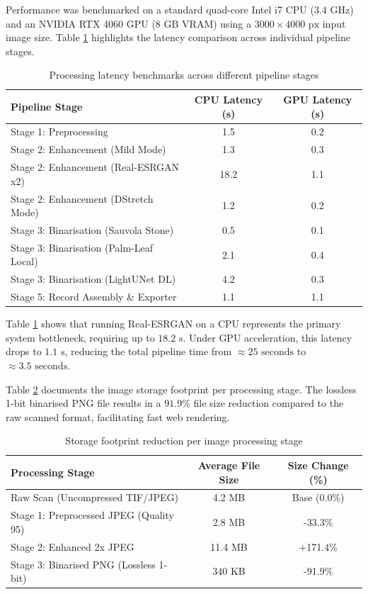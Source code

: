 Performance was benchmarked on a standard quad-core Intel i7 CPU ($3.4\text{ GHz}$) and an NVIDIA RTX 4060 GPU ($8\text{ GB}$ VRAM) using a $3000 \times 4000\text{ px}$ input image size. Table \ref{tab:processing_latency} highlights the latency comparison across individual pipeline stages.

\begin{table}[htbp]
\centering
\fontsize{10}{12}\selectfont
\caption{Processing latency benchmarks across different pipeline stages}
\label{tab:processing_latency}
\begin{tabular}{|l|c|c|}
	\hline
	Pipeline Stage & CPU Latency (s) & GPU Latency (s) \\
	\hline
	Stage 1: Preprocessing & 1.5 & 0.2 \\ \hline
	Stage 2: Enhancement (Mild Mode) & 1.3 & 0.3 \\ \hline
	Stage 2: Enhancement (Real-ESRGAN x2) & 18.2 & 1.1 \\ \hline
	Stage 2: Enhancement (DStretch Mode) & 1.2 & 0.2 \\ \hline
	Stage 3: Binarisation (Sauvola Stone) & 0.5 & 0.1 \\ \hline
	Stage 3: Binarisation (Palm-Leaf Local) & 2.1 & 0.4 \\ \hline
	Stage 3: Binarisation (LightUNet DL) & 4.2 & 0.3 \\ \hline
	Stage 5: Record Assembly \& Exporter & 1.1 & 1.1 \\
	\hline
\end{tabular}
\end{table}

Table \ref{tab:processing_latency} shows that running Real-ESRGAN on a CPU represents the primary system bottleneck, requiring up to $18.2\text{ s}$. Under GPU acceleration, this latency drops to $1.1\text{ s}$, reducing the total pipeline time from $\approx 25\text{ seconds}$ to $\approx 3.5\text{ seconds}$. 

Table \ref{tab:storage_footprint} documents the image storage footprint per processing stage. The lossless 1-bit binarised PNG file results in a $91.9\%$ file size reduction compared to the raw scanned format, facilitating fast web rendering.

\begin{table}[htbp]
\centering
\fontsize{10}{12}\selectfont
\caption{Storage footprint reduction per image processing stage}
\label{tab:storage_footprint}
\begin{tabular}{|l|c|c|}
	\hline
	Processing Stage & Average File Size & Size Change (\%) \\
	\hline
	Raw Scan (Uncompressed TIF/JPEG) & 4.2 MB & Base (0.0\%) \\ \hline
	Stage 1: Preprocessed JPEG (Quality 95) & 2.8 MB & -33.3\% \\ \hline
	Stage 2: Enhanced 2x JPEG & 11.4 MB & +171.4\% \\ \hline
	Stage 3: Binarised PNG (Lossless 1-bit) & 340 KB & -91.9\% \\
	\hline
\end{tabular}
\end{table}

